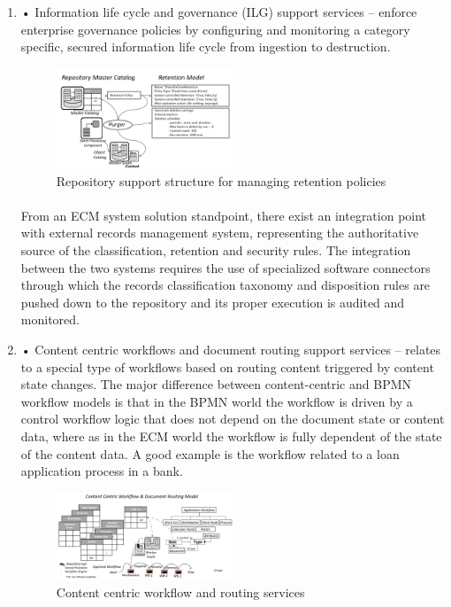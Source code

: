 \documentclass[EPiC]{easychair} %
\begin{document}
\begin{enumerate}
    \item •	Information life cycle and governance (ILG) support services – enforce enterprise governance policies by configuring and monitoring a category specific, secured information life cycle from ingestion to destruction.

\begin{figure}[hbt!]
	\begin{centering}
	\includegraphics[width=0.5\textwidth]{pics/ECMpic10}
	\caption{Repository support structure for managing retention policies}
	\label{fig:ecm-management}
	\end{centering}
\end{figure}

    \paragraph{} From an ECM system solution standpoint, there exist an integration point with external records management system, representing the authoritative source of the classification, retention and security rules. The integration between the two systems requires the use of specialized software connectors through which the records classification taxonomy and disposition rules are pushed down to the repository and its proper execution is audited and monitored.
    
    \item •	Content centric workflows and document routing support services – relates to a special type of workflows based on routing content triggered by content state changes. The major difference between content-centric and BPMN workflow models is that in the BPMN world the workflow is driven by a control workflow logic that does not depend on the document state or content data, where as in the ECM world the workflow is fully dependent of the state of the content data. A good example is the workflow related to a loan application process in a bank.

\begin{figure}[hbt!]
	\begin{centering}
	\includegraphics[width=0.5\textwidth]{pics/ECMpic11}
	\caption{Content centric workflow and routing services}
	\label{fig:ecm-workflow}
	\end{centering}
\end{figure}


\end{enumerate}
\end{document}
